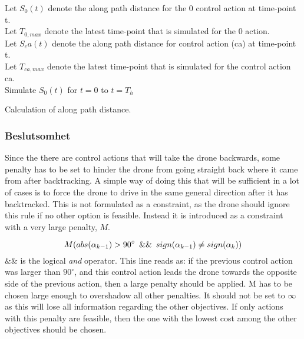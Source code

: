 \begin{algorithm}
 Let $S_0(t)$ denote the along path distance for the 0 control action at time-point t.\\
 Let $T_{0,max}$ denote the latest time-point that is simulated for the 0 action.\\
 Let $S_ca(t)$ denote the along path distance for control action (ca) at time-point t.\\
 Let $T_{ca,max}$ denote the latest time-point that is simulated for the control action ca.\\
 \null
 Simulate $S_0(t)$ for $t=0$ to $t=T_h$\\
 \null
 \caption{Calculation of along path distance. }
\end{algorithm}

\subsubsection{Beslutsomhet}

Since the there are control actions that will take the drone backwards, some penalty has to be set to hinder the drone from going straight back where it came from after backtracking. A simple way of doing this that will be sufficient in a lot of cases is to force the drone to drive in the same general direction after it has backtracked. This is not formulated as a constraint, as the drone should ignore this rule if no other option is feasible. Instead it is introduced as a constraint with a very large penalty, $M$.

\begin{equation}
    M (abs(\alpha_{k-1}) > 90^\circ \enskip  \&\& \enskip sign(\alpha_{k-1}) \neq sign(\alpha_{k}))
\end{equation}
$\&\&$ is the logical \textit{and} operator. This line reads as: if the previous control action was larger than $90^\circ$, and this control action leads the drone towards the opposite side of the previous action, then a large penalty should be applied. M has to be chosen large enough to overshadow all other penalties. It should not be set to $\infty$ as this will lose all information regarding the other objectives. If only actions with this penalty are feasible, then the one with the lowest cost among the other objectives should be chosen.

